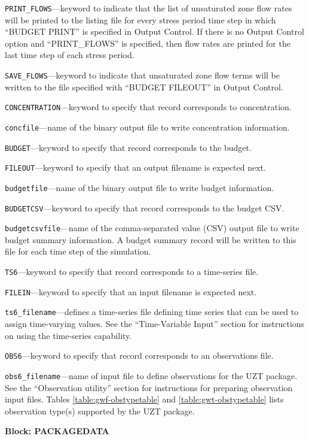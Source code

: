 \begin{description}
\item \texttt{PRINT\_FLOWS}---keyword to indicate that the list of unsaturated zone flow rates will be printed to the listing file for every stress period time step in which ``BUDGET PRINT'' is specified in Output Control.  If there is no Output Control option and ``PRINT\_FLOWS'' is specified, then flow rates are printed for the last time step of each stress period.

\item \texttt{SAVE\_FLOWS}---keyword to indicate that unsaturated zone flow terms will be written to the file specified with ``BUDGET FILEOUT'' in Output Control.

\item \texttt{CONCENTRATION}---keyword to specify that record corresponds to concentration.

\item \texttt{concfile}---name of the binary output file to write concentration information.

\item \texttt{BUDGET}---keyword to specify that record corresponds to the budget.

\item \texttt{FILEOUT}---keyword to specify that an output filename is expected next.

\item \texttt{budgetfile}---name of the binary output file to write budget information.

\item \texttt{BUDGETCSV}---keyword to specify that record corresponds to the budget CSV.

\item \texttt{budgetcsvfile}---name of the comma-separated value (CSV) output file to write budget summary information.  A budget summary record will be written to this file for each time step of the simulation.

\item \texttt{TS6}---keyword to specify that record corresponds to a time-series file.

\item \texttt{FILEIN}---keyword to specify that an input filename is expected next.

\item \texttt{ts6\_filename}---defines a time-series file defining time series that can be used to assign time-varying values. See the ``Time-Variable Input'' section for instructions on using the time-series capability.

\item \texttt{OBS6}---keyword to specify that record corresponds to an observations file.

\item \texttt{obs6\_filename}---name of input file to define observations for the UZT package. See the ``Observation utility'' section for instructions for preparing observation input files. Tables \ref{table:gwf-obstypetable} and \ref{table:gwt-obstypetable} lists observation type(s) supported by the UZT package.

\end{description}
\item \textbf{Block: PACKAGEDATA}

